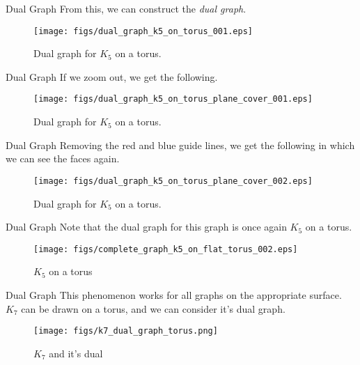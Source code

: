 \documentclass{beamer}
\begin{document}
    \begin{frame}{Dual Graph}
        From this, we can construct the \textit{dual graph}.
        \begin{figure}
            \centering
            \texttt{[image: figs/dual\_graph\_k5\_on\_torus\_001.eps]}
            \caption{Dual graph for $K_{5}$ on a torus.}
            \label{fig:dual_graph_k5_on_torus_001}
        \end{figure}
    \end{frame}
    \begin{frame}{Dual Graph}
        If we zoom out, we get the following.
        \begin{figure}
            \centering
            \texttt{[image: figs/dual\_graph\_k5\_on\_torus\_plane\_cover\_001.eps]}
            \caption{Dual graph for $K_{5}$ on a torus.}
            \label{fig:dual_graph_k5_on_torus_plane_cover_001}
        \end{figure}
    \end{frame}
    \begin{frame}{Dual Graph}
        Removing the red and blue guide lines, we get the following in which we
        can see the faces again.
        \begin{figure}
            \centering
            \texttt{[image: figs/dual\_graph\_k5\_on\_torus\_plane\_cover\_002.eps]}
            \caption{Dual graph for $K_{5}$ on a torus.}
            \label{fig:dual_graph_k5_on_torus_plane_cover_002}
        \end{figure}
    \end{frame}
    \begin{frame}{Dual Graph}
        Note that the dual graph for this graph is once again $K_{5}$ on a torus.
        \begin{figure}
            \centering
            \texttt{[image: figs/complete\_graph\_k5\_on\_flat\_torus\_002.eps]}
            \caption{$K_{5}$ on a torus}
            \label{fig:complete_graph_K5_on_flat_torus3}
        \end{figure}
    \end{frame}
    \begin{frame}{Dual Graph}
        This phenomenon works for all graphs on the appropriate surface.
        $K_{7}$ can be drawn on a torus, and we can consider it's dual graph.
        \begin{figure}
            \centering
            \texttt{[image: figs/k7\_dual\_graph\_torus.png]}
            \caption{$K_{7}$ and it's dual}
            \label{fig:k7_dual_graph_torus}
        \end{figure}
    \end{frame}
\end{document}
